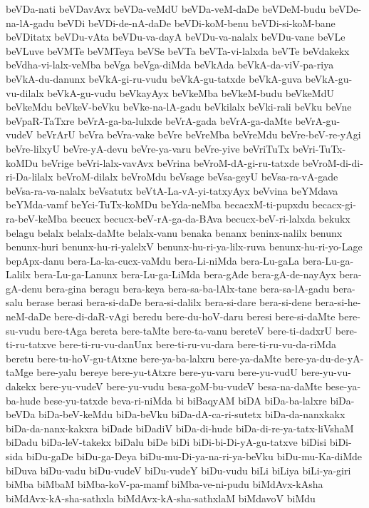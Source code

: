 {beVDa-nati
beVDavAvx
beVDa-veMdU
beVDa-veM-daDe
beVDeM-budu
beVDe-na-lA-gadu
beVDi
beVDi-de-nA-daDe
beVDi-koM-benu
beVDi-si-koM-bane
beVDitatx
beVDu-vAta
beVDu-va-dayA
beVDu-va-nalalx
beVDu-vane
beVLe
beVLuve
beVMTe
beVMTeya
beVSe
beVTa
beVTa-vi-lalxda
beVTe
beVdakekx
beVdha-vi-lalx-veMba
beVga
beVga-diMda
beVkAda
beVkA-da-viV-pa-riya
beVkA-du-danunx
beVkA-gi-ru-vudu
beVkA-gu-tatxde
beVkA-guva
beVkA-gu-vu-dilalx
beVkA-gu-vudu
beVkayAyx
beVkeMba
beVkeM-budu
beVkeMdU
beVkeMdu
beVkeV-beVku
beVke-na-lA-gadu
beVkilalx
beVki-rali
beVku
beVne
beVpaR-TaTxre
beVrA-ga-ba-lulxde
beVrA-gada
beVrA-ga-daMte
beVrA-gu-vudeV
beVrArU
beVra
beVra-vake
beVre
beVreMba
beVreMdu
beVre-beV-re-yAgi
beVre-lilxyU
beVre-yA-devu
beVre-ya-varu
beVre-yive
beVriTuTx
beVri-TuTx-koMDu
beVrige
beVri-lalx-vavAvx
beVrina
beVroM-dA-gi-ru-tatxde
beVroM-di-di-ri-Da-lilalx
beVroM-dilalx
beVroMdu
beVsage
beVsa-geyU
beVsa-ra-vA-gade
beVsa-ra-va-nalalx
beVsatutx
beVtA-La-vA-yi-tatxyAyx
beVvina
beYMdava
beYMda-vamf
beYci-TuTx-koMDu
beYda-neMba
becacxM-ti-pupxdu
becacx-gi-ra-beV-keMba
becucx
becucx-beV-rA-ga-da-BAva
becucx-beV-ri-lalxda
bekukx
belagu
belalx
belalx-daMte
belalx-vanu
benaka
benanx
beninx-nalilx
benunx
benunx-huri
benunx-hu-ri-yalelxV
benunx-hu-ri-ya-lilx-ruva
benunx-hu-ri-yo-Lage
bepApx-danu
bera-La-ka-cucx-vaMdu
bera-Li-niMda
bera-Lu-gaLa
bera-Lu-ga-Lalilx
bera-Lu-ga-Lanunx
bera-Lu-ga-LiMda
bera-gAde
bera-gA-de-nayAyx
bera-gA-denu
bera-gina
beragu
bera-keya
bera-sa-ba-lAlx-tane
bera-sa-lA-gadu
bera-salu
berase
berasi
bera-si-daDe
bera-si-dalilx
bera-si-dare
bera-si-dene
bera-si-he-neM-daDe
bere-di-daR-vAgi
beredu
bere-du-hoV-daru
beresi
bere-si-daMte
bere-su-vudu
bere-tAga
bereta
bere-taMte
bere-ta-vanu
bereteV
bere-ti-dadxrU
bere-ti-ru-tatxve
bere-ti-ru-vu-danUnx
bere-ti-ru-vu-dara
bere-ti-ru-vu-da-riMda
beretu
bere-tu-hoV-gu-tAtxne
bere-ya-ba-lalxru
bere-ya-daMte
bere-ya-du-de-yA-taMge
bere-yalu
bereye
bere-yu-tAtxre
bere-yu-varu
bere-yu-vudU
bere-yu-vu-dakekx
bere-yu-vudeV
bere-yu-vudu
besa-goM-bu-vudeV
besa-na-daMte
bese-ya-ba-hude
bese-yu-tatxde
beva-ri-niMda
bi
biBaqyAM
biDA
biDa-ba-lalxre
biDa-beVDa
biDa-beV-keMdu
biDa-beVku
biDa-dA-ca-ri-sutetx
biDa-da-nanxkakx
biDa-da-nanx-kakxra
biDade
biDadiV
biDa-di-hude
biDa-di-re-ya-tatx-liVshaM
biDadu
biDa-leV-takekx
biDalu
biDe
biDi
biDi-bi-Di-yA-gu-tatxve
biDisi
biDi-sida
biDu-gaDe
biDu-ga-Deya
biDu-mu-Di-ya-na-ri-ya-beVku
biDu-mu-Ka-diMde
biDuva
biDu-vadu
biDu-vudeV
biDu-vudeY
biDu-vudu
biLi
biLiya
biLi-ya-giri
biMba
biMbaM
biMba-koV-pa-mamf
biMba-ve-ni-pudu
biMdAvx-kAsha
biMdAvx-kA-sha-sathxla
biMdAvx-kA-sha-sathxlaM
biMdavoV
biMdu
}
